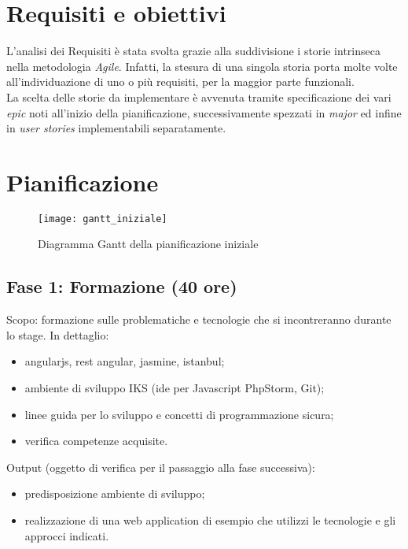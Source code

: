 \section{Requisiti e obiettivi}
L'analisi dei Requisiti è stata svolta grazie alla suddivisione i storie intrinseca nella metodologia \emph{Agile}. Infatti, la stesura di una singola storia porta molte volte all'individuazione di uno o più requisiti, per la maggior parte funzionali.\\
La scelta delle storie da implementare è avvenuta tramite specificazione dei vari \emph{epic} noti all'inizio della pianificazione, successivamente spezzati in \emph{major} ed infine in \emph{user stories} implementabili separatamente.

\section{Pianificazione}

\begin{figure}[H] 
    \centering 
    \texttt{[image: gantt\_iniziale]} 
    \caption{Diagramma Gantt della pianificazione iniziale}
\end{figure}

\subsection{Fase 1: Formazione (40 ore)}
Scopo: formazione sulle problematiche e tecnologie che si incontreranno durante lo stage.
In dettaglio:
\begin{itemize}
	\item angularjs, rest angular, jasmine, istanbul;
	\item ambiente di sviluppo IKS (\gls{ide} per Javascript PhpStorm, Git);
	\item linee guida per lo sviluppo e concetti di programmazione sicura;
	\item verifica competenze acquisite.
\end{itemize}
Output (oggetto di verifica per il passaggio alla fase successiva):
\begin{itemize}
	\item predisposizione ambiente di sviluppo;
	\item realizzazione di una web application di esempio che utilizzi le tecnologie e gli approcci
indicati.
\end{itemize}

